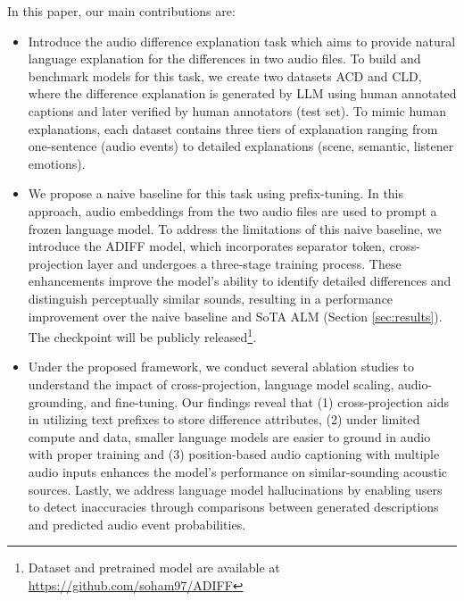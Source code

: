 In this paper, our main contributions are: \vspace{-0.1in}
\begin{itemize}
    \item Introduce the audio difference explanation task which aims to provide natural language explanation for the differences in two audio files. To build and benchmark models for this task, we create two datasets ACD and CLD, where the difference explanation is generated by LLM using human annotated captions and later verified by human annotators (test set). To mimic human explanations, each dataset contains three tiers of explanation ranging from one-sentence (audio events) to detailed explanations (scene, semantic, listener emotions).
    \item We propose a naive baseline for this task using prefix-tuning. In this approach, audio embeddings from the two audio files are used to prompt a frozen language model. To address the limitations of this naive baseline, we introduce the ADIFF model, which incorporates separator token, cross-projection layer and undergoes a three-stage training process. These enhancements improve the model’s ability to identify detailed differences and distinguish perceptually similar sounds, resulting in a performance improvement over the naive baseline and SoTA ALM (Section \ref{sec:results}). The checkpoint will be publicly released\footnote{
Dataset and pretrained model are available at \url{https://github.com/soham97/ADIFF}}. 
    \item Under the proposed framework, we conduct several ablation studies to understand the impact of cross-projection, language model scaling, audio-grounding, and fine-tuning. Our findings reveal that (1) cross-projection aids in utilizing text prefixes to store difference attributes, (2) under limited compute and data, smaller language models are easier to ground in audio with proper training and (3) position-based audio captioning with multiple audio inputs enhances the model’s performance on similar-sounding acoustic sources. Lastly, we address language model hallucinations by enabling users to detect inaccuracies through comparisons between generated descriptions and predicted audio event probabilities.
\end{itemize}